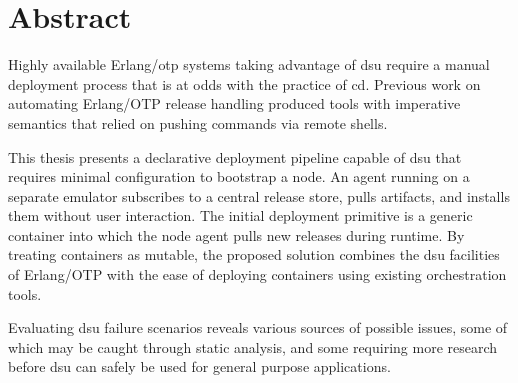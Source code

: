 \cleardoublepage{}

\section*{Abstract}

Highly available Erlang/\acrshort{otp} systems taking advantage of \acrfull{dsu} require a manual deployment process that is at odds with the practice of \acrlong{cd}. Previous work on automating Erlang/OTP release handling produced tools with imperative semantics that relied on pushing commands via remote shells.

This thesis presents a declarative deployment pipeline capable of \acrshort{dsu} that requires minimal configuration to bootstrap a node. An agent running on a separate emulator subscribes to a central release store, pulls artifacts, and installs them without user interaction. The initial deployment primitive is a generic container into which the node agent pulls new releases during runtime. By treating containers as mutable, the proposed solution combines the \acrshort{dsu} facilities of Erlang/OTP with the ease of deploying containers using existing orchestration tools.

Evaluating \acrshort{dsu} failure scenarios reveals various sources of possible issues, some of which may be caught through static analysis, and some requiring more research before \acrshort{dsu} can safely be used for general purpose applications.
